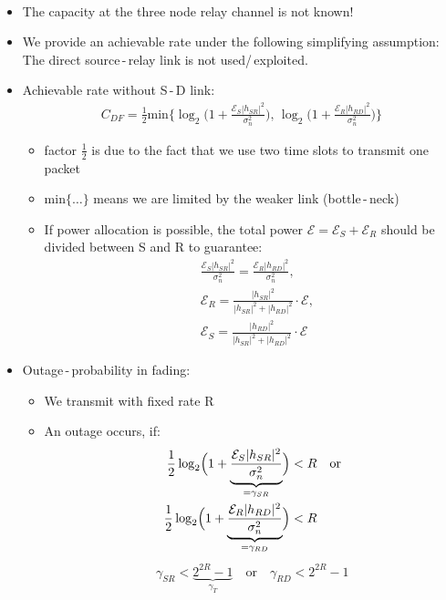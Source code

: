 \documentclass[a4paper, 10pt]{article}
\begin{document}
\paragraph{}
\begin{itemize}
	\item The capacity at the three node relay channel is not known!
	\item We provide an achievable rate under the following simplifying assumption: The direct source\,-\,relay link is not used/\,exploited.
	\item Achievable rate without S\,-\,D link:
	\begin{align*}
		\boxed{C_{DF} = \frac{1}{2}\text{min}\bigl\{\log_2\bigl(1 + \frac{\mathcal{E}_S|h_{SR}|^2}{\sigma_n^2}\bigr),\,\log_2\bigl(1 + \frac{\mathcal{E}_R|h_{RD}|^2}{\sigma_n^2}\bigr)\bigr\} }	
	\end{align*}	 
	\begin{itemize}
		\item factor $\frac{1}{2} $ is due to the fact that we use two time slots to transmit one packet
		\item $\text{min}\{\ldots\} $ means we are limited by the weaker link (bottle\,-\,neck)
		\item If power allocation is possible, the total power $ \mathcal{E} = \mathcal{E}_S + \mathcal{E}_R $ should be divided between S and R to guarantee:
		\begin{align*}
			&\frac{\mathcal{E}_S|h_{SR}|^2}{\sigma_n^2} = \frac{\mathcal{E}_R|h_{RD}|^2}{\sigma_n^2},\\
			&\mathcal{E}_R = \frac{|h_{SR}|^2}{|h_{SR}|^2 + |h_{RD}|^2}\cdot\mathcal{E},\\
			&\mathcal{E}_S = \frac{|h_{RD}|^2}{|h_{SR}|^2 + |h_{RD}|^2}\cdot\mathcal{E}
		\end{align*}
	\end{itemize}
	\item Outage\,-\,probability in fading:
	\begin{itemize}
		\item We transmit with fixed rate R
		\item An outage occurs, if:
		\begin{align*}
			\frac{1}{2}\log_2\Bigl(1 + \underbrace{\frac{\mathcal{E}_S|h_{SR}|^2}{\sigma_n^2}}_{= \gamma_{SR}}\Bigr) &< R \quad	\text{or} \\
			\frac{1}{2}\log_2\Bigl(1 + \underbrace{\frac{\mathcal{E}_R|h_{RD}|^2}{\sigma_n^2}}_{= \gamma_{RD}}\Bigr) &< R
		\end{align*}
		\begin{align*}
			\boxed{\gamma_{SR} < \underbrace{2^{2R} - 1}_{\gamma_T} \quad \text{or}\quad \gamma_{RD} < 2^{2R} - 1}
		\end{align*}
	\end{itemize}
\end{itemize}
\end{document}
